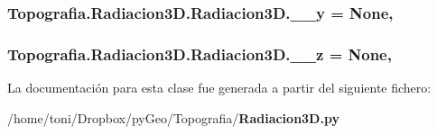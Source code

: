 \subsubsection[{\-\_\-\-\_\-y}]{\setlength{\rightskip}{0pt plus 5cm}Topografia.\-Radiacion3\-D.\-Radiacion3\-D.\-\_\-\-\_\-y = None\hspace{0.3cm}{\ttfamily [static]}, {\ttfamily [private]}}\label{classTopografia_1_1Radiacion3D_1_1Radiacion3D_a8ff9d699c6bfee85c3e863ad1868cd4f}
\subsubsection[{\-\_\-\-\_\-z}]{\setlength{\rightskip}{0pt plus 5cm}Topografia.\-Radiacion3\-D.\-Radiacion3\-D.\-\_\-\-\_\-z = None\hspace{0.3cm}{\ttfamily [static]}, {\ttfamily [private]}}\label{classTopografia_1_1Radiacion3D_1_1Radiacion3D_ad82cfa57fa7267a328093db2d2e5bbc7}


La documentación para esta clase fue generada a partir del siguiente fichero\-:\begin{DoxyCompactItemize}
\item 
/home/toni/\-Dropbox/py\-Geo/\-Topografia/{\bf Radiacion3\-D.\-py}\end{DoxyCompactItemize}
